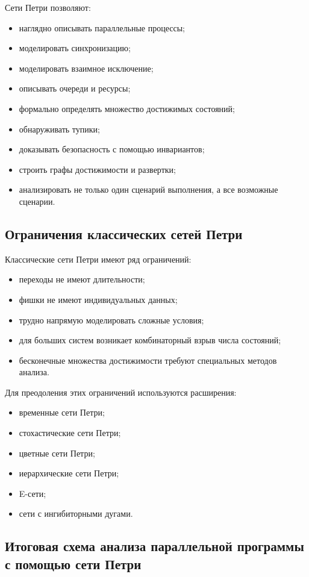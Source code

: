 \documentclass[12pt,a4paper]{article}
\begin{document}
Сети Петри позволяют:
\begin{itemize}
    \item наглядно описывать параллельные процессы;
    \item моделировать синхронизацию;
    \item моделировать взаимное исключение;
    \item описывать очереди и ресурсы;
    \item формально определять множество достижимых состояний;
    \item обнаруживать тупики;
    \item доказывать безопасность с помощью инвариантов;
    \item строить графы достижимости и развертки;
    \item анализировать не только один сценарий выполнения, а все возможные сценарии.
\end{itemize}

\subsection{Ограничения классических сетей Петри}

Классические сети Петри имеют ряд ограничений:
\begin{itemize}
    \item переходы не имеют длительности;
    \item фишки не имеют индивидуальных данных;
    \item трудно напрямую моделировать сложные условия;
    \item для больших систем возникает комбинаторный взрыв числа состояний;
    \item бесконечные множества достижимости требуют специальных методов анализа.
\end{itemize}

Для преодоления этих ограничений используются расширения:
\begin{itemize}
    \item временные сети Петри;
    \item стохастические сети Петри;
    \item цветные сети Петри;
    \item иерархические сети Петри;
    \item E-сети;
    \item сети с ингибиторными дугами.
\end{itemize}

\subsection{Итоговая схема анализа параллельной программы с помощью сети Петри}
\end{document}
